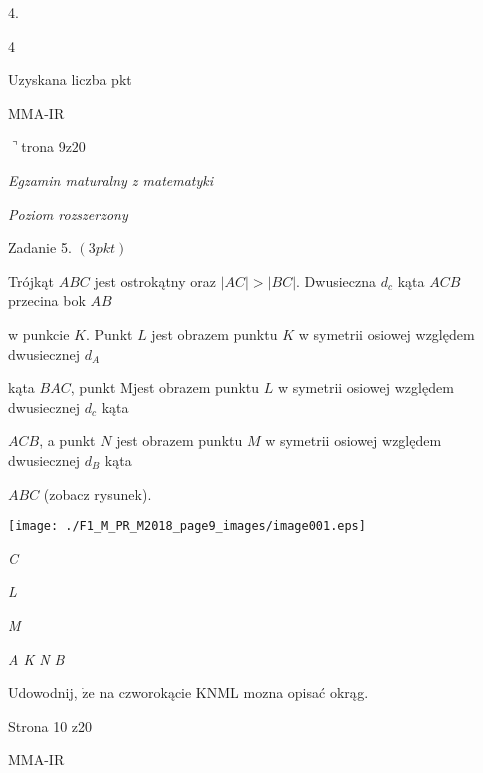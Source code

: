 \documentclass[a4paper,12pt]{article}
\begin{document}
4.

4

Uzyskana liczba pkt

MMA-IR

$\urcorner$trona 9$\mathrm{z}20$





{\it Egzamin maturalny z matematyki}

{\it Poziom rozszerzony}

Zadanie 5. $(3pkt)$

Trójkąt $ABC$ jest ostrokątny oraz $|AC|>|BC|$. Dwusieczna $d_{c}$ kąta $ACB$ przecina bok $AB$

w punkcie $K$. Punkt $L$ jest obrazem punktu $K$ w symetrii osiowej względem dwusiecznej $d_{A}$

kąta $BAC$, punkt Mjest obrazem punktu $L$ w symetrii osiowej względem dwusiecznej $d_{c}$ kąta

$ACB$, a punkt $N$ jest obrazem punktu $M$ w symetrii osiowej względem dwusiecznej $d_{B}$ kąta

$ABC$ (zobacz rysunek).
\begin{center}
\texttt{[image: ./F1\_M\_PR\_M2018\_page9\_images/image001.eps]}
\end{center}
{\it C}

{\it L}

{\it M}

{\it A  K N  B}

Udowodnij, $\dot{\mathrm{z}}\mathrm{e}$ na czworokącie KNML mozna opisać okrąg.

Strona 10 z20

MMA-IR
\end{document}
